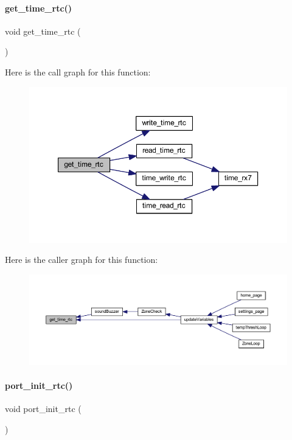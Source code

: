 \paragraph{get\+\_\+time\+\_\+rtc()}
{\footnotesize\ttfamily void get\+\_\+time\+\_\+rtc (\begin{DoxyParamCaption}{ }\end{DoxyParamCaption})}

Here is the call graph for this function\+:
\nopagebreak
\begin{figure}[H]
\begin{center}
\leavevmode
\includegraphics[width=350pt]{a00044_a628868f4036626e8fa1b055bf56dc2f1_cgraph}
\end{center}
\end{figure}
Here is the caller graph for this function\+:
\nopagebreak
\begin{figure}[H]
\begin{center}
\leavevmode
\includegraphics[width=350pt]{a00044_a628868f4036626e8fa1b055bf56dc2f1_icgraph}
\end{center}
\end{figure}
\mbox{\label{a00044_a4144a5333b1a934957b78e4b2d0f8695}} 
\paragraph{port\+\_\+init\+\_\+rtc()}
{\footnotesize\ttfamily void port\+\_\+init\+\_\+rtc (\begin{DoxyParamCaption}{ }\end{DoxyParamCaption})}

